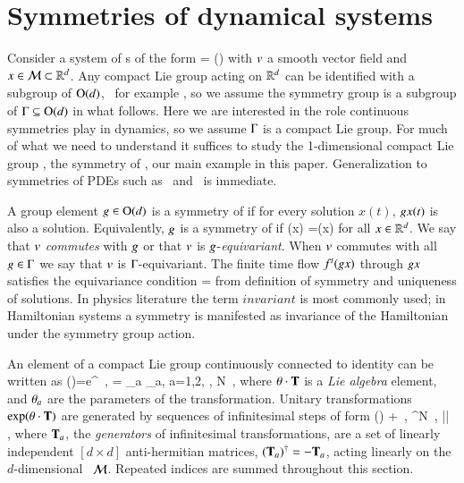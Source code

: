 
\section{\label{s:symDyn} Symmetries of dynamical systems}

Consider a system of \ode s of the form
\beq
	\dot{\ssp} = \vf(\ssp)
	\label{eq:difeq}
\eeq
with $v$ a smooth vector field and $x\in{\cal M}\subset\mathbb{R}^{d}$.
Any compact Lie group acting on $\mathbb{R}^{d}$ can be identified
with a subgroup of $\textrm{O}(d)$, \cf\ for example ,
so we assume the symmetry group is a subgroup of $\Gamma\subseteq\textrm{O}(d)$ in what
follows.
Here we are interested in the role continuous symmetries play in dynamics, so we
assume $\Gamma$ is a compact Lie group. For much of what we need to
understand it suffices to study the 1-dimensional compact Lie group ,
the symmetry of \cLe, our main example in this paper. Generalization to
symmetries of PDEs such as \KS\ and \pCf\ is immediate.

A group element $g\in\textrm{O}(d)$ is a symmetry of
 if for every solution $x(t)$, $g x(t)$ is
also a solution. Equivalently, $g$ is a symmetry of
 if
\beq
	\vf(\LieEl x) =\LieEl \vf(x)
	\label{eq:equiv}
\eeq
for all $x\in\mathbb{R}^{d}$. We say that
$v$ \emph{commutes} with $g$ or that $v$ is
$g$-\emph{equivariant}. When $v$ commutes with all
$g\in\Gamma$ we say that $v$ is $\Gamma$-equivariant.
The finite time flow ${f^{t}(g x)}$ through $g
x$ satisfies the equivariance condition
\beq\label{eq:equivFinite}
=\LieEl{}
\eeq
from definition of symmetry and
uniqueness of solutions. In physics literature the term
$invariant$ is most commonly used; in
Hamiltonian systems a symmetry is manifested as invariance of the
Hamiltonian under the symmetry group action.


An element of a compact Lie group
continuously connected to identity can be written as
\beq
\LieEl(\gSpace)=e^{\gSpace \cdot \Lg }
	\,,\qquad
\gSpace \cdot \Lg  = \sum \gSpace_a \Lg_a,\; a=1,2, \cdots, N
\,,
where
${\bf \theta} \cdot \mathbf{T}$
is a {\em Lie algebra} element,  and ${\bf \theta}_a$ are the parameters
of the transformation.
{Unitary} transformations $ \exp({\bf \theta} \cdot {\ensuremath{\mathbf{T}}}) $ are
generated by sequences of infinitesimal steps of form
\beq
\LieEl(\delta\gSpace)  + \delta \gSpace \cdot \Lg
    \,,\quad
\delta\gSpace \in \reals^N
    \,,\quad
|\delta \gSpace| 
    \, ,
where $\mathbf{T}_a$, the {\em generators} of infinitesimal
transformations, are a set of linearly independent
$[d\!\times\!d]$ anti-hermitian matrices, $(\mathbf{T}_a)^\dagger =
- \mathbf{T}_a$, acting linearly on the $d$-dim\-ens\-ion\-al \statesp\
${\cal M}$. Repeated indices are summed throughout this section.


